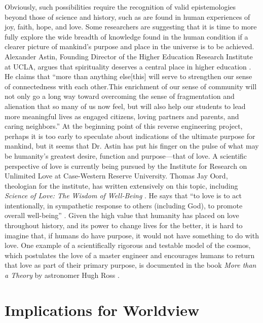 Obviously, such possibilities require the recognition of valid
epistemologies beyond those of science and history, such as are found
in human experiences of joy, faith, hope, and love. Some researchers
are suggesting that it is time to more fully explore the wide breadth of
knowledge found in the human condition if a clearer picture of
mankind’s purpose and place in the universe is to be achieved.
Alexander Astin, Founding Director of the Higher Education Research
Institute at UCLA, argues that spirituality deserves a central place in
higher education \citep{astin2004}. He claims that ``more than
anything else{\jdots}[this] will serve to strengthen our sense of
connectedness with each other.{\jdots}This enrichment of our sense of community
will not only go a long way toward overcoming the sense of
fragmentation and alienation that so many of us now feel, but will also
help our students to lead more meaningful lives as engaged citizens,
loving partners and parents, and caring neighbors.'' At the beginning
point of this reverse engineering project, perhaps it is too early to
speculate about indications of the ultimate purpose for mankind, but it
seems that Dr. Astin has put his finger on the pulse of what may be
humanity’s greatest desire, function and purpose---that of love. A
scientific perspective of love is currently being pursued by the
Institute for Research on Unlimited Love at Case-Western Reserve
University. Thomas Jay Oord, theologian for the institute, has written
extensively on this topic, including \textit{Science of Love: The
Wisdom of Well-Being} \citep{oord2004}. He says that
“to love is to act intentionally, in
sympathetic response to others (including God), to promote overall
well-being” \citep[][p.~75]{oord2004}. Given the high value that humanity has placed on love
throughout history, and its power to change lives for the better, it is
hard to imagine that, if humans do have purpose, it would not have
something to do with love. One example of a scientifically rigorous and
testable model of the cosmos, which postulates the love of a master
engineer and encourages humans to return that love as part of their
primary purpose, is documented in the book
\textit{More than a Theory} 
by astronomer Hugh Ross
\citep{ross2009}.

\section{Implications for Worldview}


